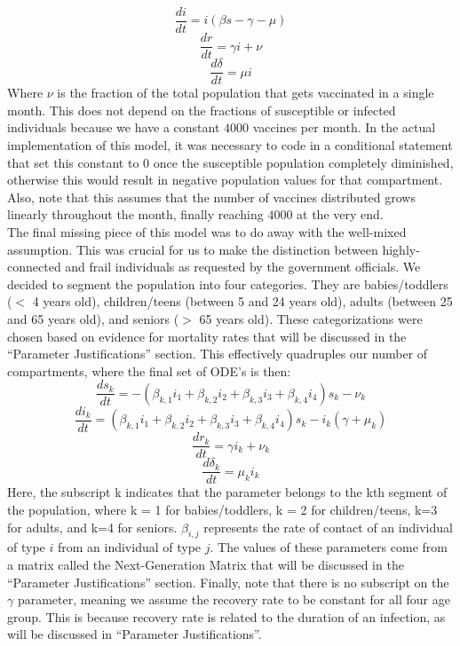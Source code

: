 \documentclass[titlepage]{article}
\begin{document}
	\[
		\frac{di}{dt} =  i (\beta s -\gamma - \mu)
	\]
	\[
		\frac{dr}{dt} = \gamma i + \nu
	\]
	\[
		\frac{d\delta}{dt} = \mu i
	\]
	Where $\nu$ is the fraction of the total population that gets vaccinated in a single month. This does not depend on the fractions of susceptible or infected individuals because we have a constant $4000$ vaccines per month. In the actual implementation of this model, it was necessary to code in a conditional statement that set this constant to $0$ once the susceptible population completely diminished, otherwise this would result in negative population values for that compartment. Also, note that this assumes that the number of vaccines distributed grows linearly throughout the month, finally reaching $4000$ at the very end.\\

	The final missing piece of this model was to do away with the well-mixed assumption. This was crucial for us to make the distinction between highly-connected and frail individuals as requested by the government officials. We decided to segment the population into four categories. They are babies/toddlers ($<$ 4 years old), children/teens (between 5 and 24 years old), adults (between 25 and 65 years old), and seniors ($>$ 65 years old). These categorizations were chosen based on evidence for mortality rates that will be discussed in the ``Parameter Justifications'' section. This effectively quadruples our number of compartments, where the final set of ODE's is then:
	\[
		\frac{ds_k}{dt} = - (\beta_{k,1} i_1 + \beta_{k,2} i_2 + \beta_{k,3} i_3 + \beta_{k,4} i_4) s_k - \nu_k
	\]
	\[
		\frac{di_k}{dt} =  (\beta_{k,1} i_1 + \beta_{k,2} i_2 + \beta_{k,3} i_3 + \beta_{k,4} i_4) s_k - i_k (\gamma + \mu_k)
	\]
	\[
		\frac{dr_k}{dt} = \gamma i_k + \nu_k
	\]
	\[
		\frac{d\delta_k}{dt} = \mu_k i_k
	\]
	Here, the subscript k indicates that the parameter belongs to the kth segment of the population, where k = 1 for babies/toddlers, k = 2 for children/teens, k=3 for adults, and k=4 for seniors. $\beta_{i,j}$ represents the rate of contact of an individual of type $i$ from an individual of type $j$. The values of these parameters come from a matrix called the Next-Generation Matrix \cite{NGM} that will be discussed in the ``Parameter Justifications'' section. Finally, note that there is no subscript on the $\gamma$ parameter, meaning we assume the recovery rate to be constant for all four age group. This is because recovery rate is related to the duration of an infection, as will be discussed in ``Parameter Justifications''.\\
\end{document}
